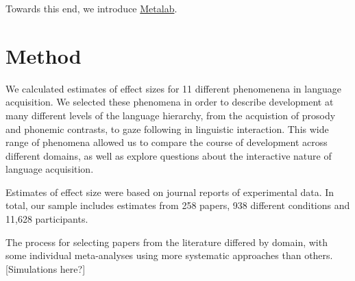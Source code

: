 \documentclass[american,floatsintext,man]{apa6}
\begin{document}
Towards this end, we introduce
\href{http://metalab.stanford.edu/}{Metalab}.

\section{Method}\label{method}

We calculated estimates of effect sizes for 11 different phenomenena in
language acquisition. We selected these phenomena in order to describe
development at many different levels of the language hierarchy, from the
acquistion of prosody and phonemic contrasts, to gaze following in
linguistic interaction. This wide range of phenomena allowed us to
compare the course of development across different domains, as well as
explore questions about the interactive nature of language acquisition.

Estimates of effect size were based on journal reports of experimental
data. In total, our sample includes estimates from 258 papers, 938
different conditions and 11,628 participants.

The process for selecting papers from the literature differed by domain,
with some individual meta-analyses using more systematic approaches than
others. {[}Simulations here?{]} \renewcommand{\arraystretch}{1.5}
\end{document}
